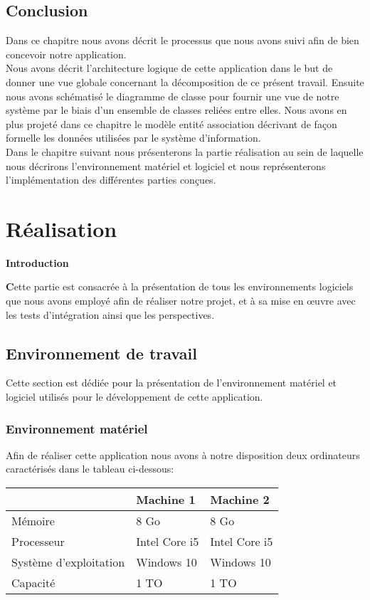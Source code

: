 \documentclass[a4paper,12pt,oneside]{report}
\begin{document}
\section{Conclusion}
Dans ce chapitre nous avons décrit le processus que nous avons suivi afin de bien concevoir notre application. \\
Nous avons décrit l'architecture logique de cette application dans le but de donner une vue globale concernant la décomposition de ce présent travail.
Ensuite nous avons schématisé le diagramme de classe  pour fournir une vue  de notre système par le biais d'un ensemble de classes reliées entre elles. Nous avons en plus projeté dans ce chapitre le modèle entité association décrivant de façon formelle les données utilisées par le système d'information.\\
Dans le chapitre suivant nous présenterons la partie réalisation au sein de laquelle nous décrirons l'environnement matériel et logiciel et nous représenterons l'implémentation des différentes parties conçues.

  \chapter{Réalisation}
  \begin{flushleft}
  \textbf\Huge\bf Introduction
  \end{flushleft}
  
\textbf Cette partie est consacrée à la présentation de tous les environnements logiciels que nous avons employé afin de réaliser notre projet, et à sa mise en œuvre  avec les tests d'intégration ainsi que les perspectives.

  \section{Environnement de travail }
  Cette section est dédiée pour la présentation de l'environnement matériel et logiciel utilisés pour le développement de cette application.

  \subsection{Environnement matériel}
  Afin de réaliser cette application nous avons à notre disposition deux ordinateurs caractérisés dans le tableau ci-dessous: \\
 \begin{center}
\begin{tabular}{|l|l|l|}
\hline  & Machine 1 & Machine 2  \\
\hline  Mémoire & 8 Go & 8 Go   \\
\hline  Processeur & Intel Core i5 & Intel Core i5 \\
\hline  Système d'exploitation & Windows 10 & Windows 10   \\
\hline  Capacité & 1 TO & 1 TO   \\
\hline 
\end{tabular}
\label{tab1}
\end{center}
\end{document}

